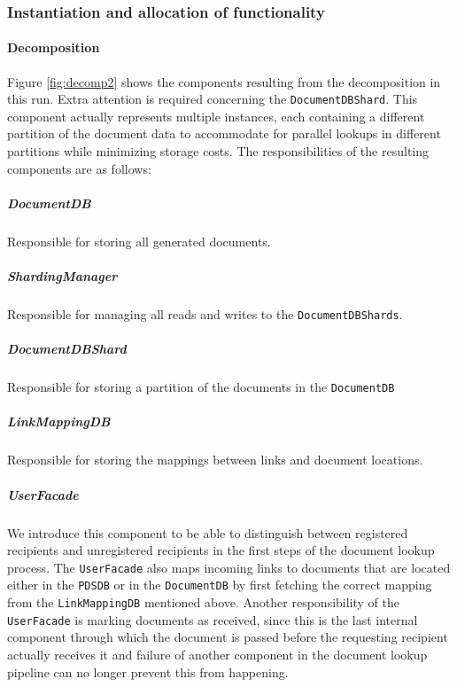 \documentclass[a4paper,10pt]{article}
\begin{document}

\subsubsection{Instantiation and allocation of functionality}
\paragraph{Decomposition}
Figure \ref{fig:decomp2} shows the components resulting from the decomposition in this run. Extra attention is required concerning the \texttt{DocumentDBShard}. This component actually represents multiple instances, each containing a different partition of the document data to accommodate for parallel lookups in different partitions while minimizing storage costs.
The responsibilities of the resulting components are as follows:

\subparagraph{DocumentDB}
Responsible for storing all generated documents.

\subparagraph{ShardingManager}
Responsible for managing all reads and writes to the \texttt{DocumentDBShards}.

\subparagraph{DocumentDBShard}
Responsible for storing a partition of the documents in the \texttt{DocumentDB}

\subparagraph{LinkMappingDB}
Responsible for storing the mappings between links and document locations.

\subparagraph{UserFacade}
We introduce this component to be able to distinguish between registered recipients and unregistered recipients in the first steps of the document lookup process. The \texttt{UserFacade} also maps incoming links to documents that are located either in the \texttt{PDSDB} or in the \texttt{DocumentDB} by first fetching the correct mapping from the \texttt{LinkMappingDB} mentioned above. Another responsibility of the \texttt{UserFacade} is marking documents as received, since this is the last internal component through which the document is passed before the requesting recipient actually receives it and failure of another component in the document lookup pipeline can no longer prevent this from happening.
\end{document}
